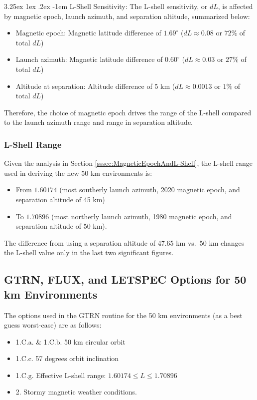 \documentclass{hitec}
\makeatletter
\renewcommand\paragraph{\@startsection{paragraph}{5}{\z@}%
	{3.25ex \@plus1ex \@minus.2ex}%
	{-1em}%
	{\normalfont\normalsize\bfseries}}
\makeatother
\begin{document}
\paragraph{L-Shell Sensitivity:}
The L-shell sensitivity, or $dL$, is affected by magnetic epoch, launch azimuth, and separation altitude, summarized below:
\begin{itemize}
	\item Magnetic epoch: Magnetic latitude difference of $1.69^\circ$ ($dL \approx 0.08$ or $72\%$ of total $dL$)
	\item Launch azimuth: Magnetic latitude difference of $0.60^\circ$ ($dL \approx 0.03$ or $27\%$ of total $dL$)
	\item Altitude at separation: Altitude difference of $5$ km ($dL \approx 0.0013$ or $1\%$ of total $dL$)
\end{itemize}
Therefore, the choice of magnetic epoch drives the range of the L-shell compared to the launch azimuth range and range in separation altitude.

\subsubsection{L-Shell Range}
Given the analysis in Section \ref{sssec:MagneticEpochAndL-Shell}, the L-shell range used in deriving the new 50 km environments is:
\begin{itemize}
	\item From $1.60174$ (most southerly launch azimuth, 2020 magnetic epoch, and separation altitude of 45 km)
	\item To $1.70896$ (most northerly launch azimuth, 1980 magnetic epoch, and separation altitude of 50 km).
\end{itemize}

The difference from using a separation altitude of 47.65 km vs.\ 50 km changes the L-shell value only in the last two significant figures.

\subsection{\textsf{GTRN}, \textsf{FLUX}, and \textsf{LETSPEC} Options for 50 km Environments}
The options used in the \textsf{GTRN} routine for the 50 km environments (as a best guess worst-case) are as follows:

\begin{itemize}
	\item 1.C.a. \& 1.C.b. 50 km circular orbit
	\item 1.C.c. 57 degrees orbit inclination
	\item 1.C.g. Effective L-shell range: $1.60174 \le L \le 1.70896$
	\item 2. Stormy magnetic weather conditions.
\end{itemize}
\end{document}
